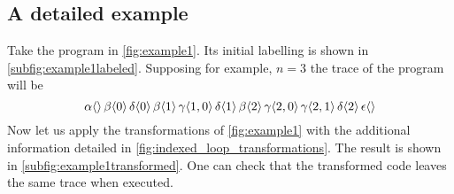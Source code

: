 \documentclass[submission,copyright,creativecommons]{eptcs}
\theoremstyle{definition}
\newcommand{\ass}{\mathrel{:=}}
\def\lbl#1:{\mbox{\color{blue}$#1$}:}
\begin{document}
\subsection{A detailed example}\label{ssec:detailedex}
Take the program in \autoref{fig:example1}. Its initial labelling is
shown in \autoref{subfig:example1labeled}.
Supposing for example, $n=3$
the trace of the program will be
$$\alpha\langle\rangle\,\beta\langle 0 \rangle\, \delta\langle 0\rangle\,\beta\langle 1\rangle\,\gamma\langle 1,0\rangle\,
\delta\langle 1\rangle\,\beta\langle 2\rangle\,\gamma\langle 2,0\rangle\,\gamma\langle 2, 1\rangle\,\delta\langle 2\rangle\,
\epsilon\langle\rangle$$
Now let us apply the transformations of \autoref{fig:example1} with the additional
information detailed in \autoref{fig:indexed_loop_transformations}. The result is shown in
\autoref{subfig:example1transformed}. One can check that the transformed code leaves the same trace when executed.
\begin{figure}[!ht]
{}\hfill
\begin{minipage}{4.4cm}
\subcaption{}
\label{subfig:example1labeled}
\end{minipage}
\hfill
\begin{minipage}{9.25cm}
\end{minipage}
\end{figure}
\end{document}
